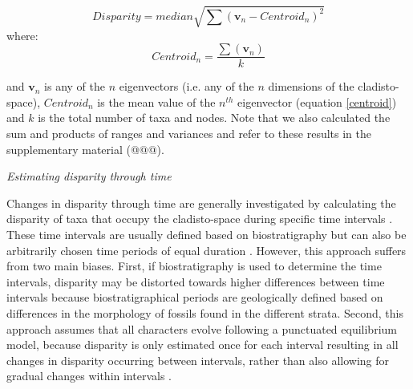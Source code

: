 \documentclass[12pt,letterpaper]{article}
\renewcommand{\subsection}[1]{%
\bigskip
\begin{center}
\begin{large}
\normalfont\itshape #1
\end{large}
\end{center}}
\begin{document}
\begin{equation}
   Disparity=median{\displaystyle\sqrt{\sum{(\mathbf{v}_{n}-Centroid_{n})^2}}}
    \label{disparity}
\end{equation}
where:
\begin{equation}
    Centroid_{n}=\frac{\displaystyle\sum(\mathbf{v}_{n})}{k} 
    \label{centroid}
\end{equation}

\noindent
and $\mathbf{v}_{n}$ is any of the $n$ eigenvectors (i.e. any of the $n$ dimensions of the cladisto-space), $Centroid_{n}$ is the mean value of the $n^{th}$ eigenvector (equation \ref{centroid}) and $k$ is the total number of taxa and nodes.
Note that we also calculated the sum and products of ranges and variances and refer to these results in the supplementary material (@@@). %

\subsection{Estimating disparity through time} 
Changes in disparity through time are generally investigated by calculating the disparity of taxa that occupy the cladisto-space during specific time intervals \citep[e.g][]{cisneros2010,prentice2011,Hughes20082013,hopkinsdecoupling2013,bentonmodels2014,bensonfaunal2014}.
These time intervals are usually defined based on biostratigraphy \citep[e.g.][]{cisneros2010,prentice2011,Hughes20082013,bentonmodels2014} but can also be arbitrarily chosen time periods of equal duration \citep{Butler2012,hopkinsdecoupling2013,bensonfaunal2014}.
However, this approach suffers from two main biases. 
First, if biostratigraphy is used to determine the time intervals, disparity may be distorted towards higher differences between time intervals because biostratigraphical periods are geologically defined based on differences in the morphology of fossils found in the different strata.
Second, this approach assumes that all characters evolve following a punctuated equilibrium model, because disparity is only estimated once for each interval resulting in all changes in disparity occurring between intervals, rather than also allowing for gradual changes within intervals \citep{Hunt21042015}.
\end{document}
